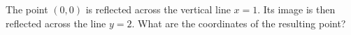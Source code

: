 The point $(0,0)$ is reflected across the vertical line $x=1$. Its image is then reflected across the line $y=2$. What are the coordinates of the resulting point?
